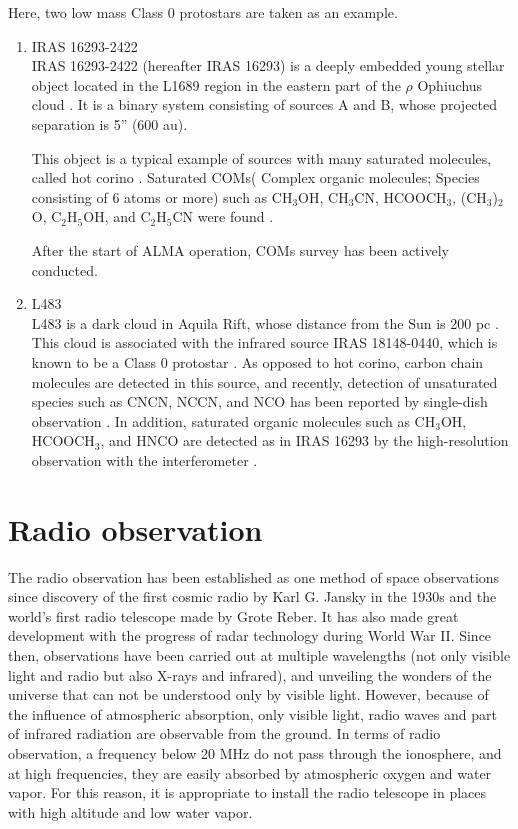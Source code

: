 Here, two low mass Class 0 protostars are taken as an example.
\begin{enumerate}
  \item IRAS 16293-2422 \\
IRAS 16293-2422 (hereafter IRAS 16293) is a deeply embedded young stellar object located 
in the L1689 region in the eastern part of the $\rho$ Ophiuchus cloud \citep[at d = 120 pc][]{Loinard+2008}.
It is a binary system consisting of sources A and B, whose projected separation is 5'' (600 au).

This object is a typical example of sources with many saturated molecules, called hot corino \citep{Cazaux+2003}.
Saturated COMs( Complex organic molecules; Species consisting of 6 atoms or more) such as 
CH$_3$OH, CH$_3$CN, HCOOCH$_3$, (CH$_3$)$_2$O, C$_2$H$_5$OH, and C$_2$H$_5$CN were found 
\citep{Blake+1994,vanDishoeck+1995,Cazaux+2003}.

After the start of ALMA operation, COMs survey has been actively conducted. 
\citep[e.g., The ALMA Protostellar Interferometric Line Survey (PILS)][]{Jorgensen+2016}

  \item L483 \\
L483 is a dark cloud in Aquila Rift, whose distance from the Sun is 200 pc \citep{Jorgensen+2002,Rice+2006}.
This cloud is associated with the infrared source IRAS 18148-0440,
which is known to be a Class 0 protostar \citep{Fuller+1995,Chapman+2013}.
As opposed to hot corino, carbon chain molecules \citep[e.g., CS, CCH. See][]{Hirota+2009,Hirota+2010}
 are detected in this source, and 
recently, detection of unsaturated species such as CNCN, NCCN, and NCO has been reported by single-dish observation \citep{Agndez+2018,Marcelino+2018}.
In addition, saturated organic molecules such as CH$_3$OH, HCOOCH$_3$, and HNCO are 
detected as in IRAS 16293 by the high-resolution observation with the interferometer \citep{Oya+2018b}.
\end{enumerate}

\newpage
\section{Radio observation}
The radio observation has been established as one method of space observations 
since discovery of the first cosmic radio by Karl G. Jansky in the 1930s and the world's first radio telescope made by Grote Reber. 
It has also made great development with the progress of radar technology during World War II.
Since then, observations have been carried out at multiple wavelengths (not only visible light and radio but also X-rays and infrared), 
and unveiling the wonders of the universe that can not be understood only by visible light.
However, because of the influence of atmospheric absorption, only visible light, radio waves and part of infrared radiation are observable from the ground.
In terms of radio observation, a frequency below 20 MHz do not pass through the ionosphere, 
and at high frequencies, they are easily absorbed by atmospheric oxygen and water vapor. 
For this reason, it is appropriate to install the radio telescope in places with high altitude and low water vapor. 

